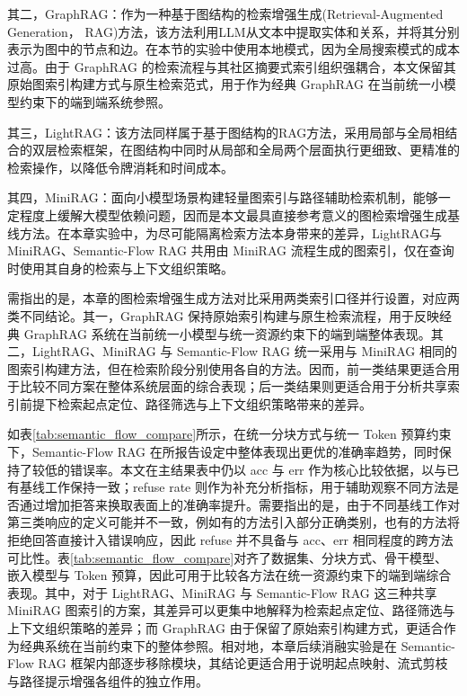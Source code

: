 \documentclass[promaster, vlined]{DissertUESTC}
\begin{document}
其二，GraphRAG\cite{edge2024local}：作为一种基于图结构的检索增强生成(Retrieval-Augmented Generation， RAG)方法，该方法利用LLM从文本中提取实体和关系，并将其分别表示为图中的节点和边。在本节的实验中使用本地模式，因为全局搜索模式的成本过高。由于 GraphRAG 的检索流程与其社区摘要式索引组织强耦合，本文保留其原始图索引构建方式与原生检索范式，用于作为经典 GraphRAG 在当前统一小模型约束下的端到端系统参照。

其三，LightRAG\cite{guo2024lightrag}：该方法同样属于基于图结构的RAG方法，采用局部与全局相结合的双层检索框架，在图结构中同时从局部和全局两个层面执行更细致、更精准的检索操作，以降低令牌消耗和时间成本。

其四，MiniRAG\cite{fan2024minirag}：面向小模型场景构建轻量图索引与路径辅助检索机制，能够一定程度上缓解大模型依赖问题，因而是本文最具直接参考意义的图检索增强生成基线方法。在本章实验中，为尽可能隔离检索方法本身带来的差异，LightRAG与 MiniRAG、Semantic-Flow RAG 共用由 MiniRAG 流程生成的图索引，仅在查询时使用其自身的检索与上下文组织策略。

需指出的是，本章的图检索增强生成方法对比采用两类索引口径并行设置，对应两类不同结论。其一，GraphRAG 保持原始索引构建与原生检索流程，用于反映经典 GraphRAG 系统在当前统一小模型与统一资源约束下的端到端整体表现。其二，LightRAG、MiniRAG 与 Semantic-Flow RAG 统一采用与 MiniRAG 相同的图索引构建方法，但在检索阶段分别使用各自的方法。因而，前一类结果更适合用于比较不同方案在整体系统层面的综合表现；后一类结果则更适合用于分析共享索引前提下检索起点定位、路径筛选与上下文组织策略带来的差异。

如表\ref{tab:semantic_flow_compare}所示，在统一分块方式与统一 Token 预算约束下，Semantic-Flow RAG 在所报告设定中整体表现出更优的准确率趋势，同时保持了较低的错误率。本文在主结果表中仍以 acc 与 err 作为核心比较依据，以与已有基线工作保持一致；refuse rate 则作为补充分析指标，用于辅助观察不同方法是否通过增加拒答来换取表面上的准确率提升。需要指出的是，由于不同基线工作对第三类响应的定义可能并不一致，例如有的方法引入部分正确类别，也有的方法将拒绝回答直接计入错误响应，因此 refuse 并不具备与 acc、err 相同程度的跨方法可比性。表\ref{tab:semantic_flow_compare}对齐了数据集、分块方式、骨干模型、嵌入模型与 Token 预算，因此可用于比较各方法在统一资源约束下的端到端综合表现。其中，对于 LightRAG、MiniRAG 与 Semantic-Flow RAG 这三种共享 MiniRAG 图索引的方案，其差异可以更集中地解释为检索起点定位、路径筛选与上下文组织策略的差异；而 GraphRAG 由于保留了原始索引构建方式，更适合作为经典系统在当前约束下的整体参照。相对地，本章后续消融实验是在 Semantic-Flow RAG 框架内部逐步移除模块，其结论更适合用于说明起点映射、流式剪枝与路径提示增强各组件的独立作用。
\end{document}
